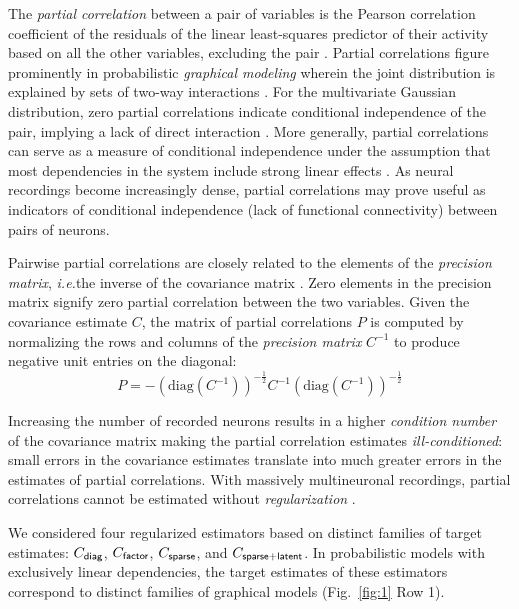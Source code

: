 The \emph{partial correlation} between a pair of variables is the Pearson correlation coefficient of the residuals of the linear least-squares predictor of their activity based on all the other variables, excluding the pair \citep{Anderson:2003, Whittaker:1990}. Partial correlations figure prominently in probabilistic \emph{graphical modeling} wherein the joint distribution is explained by sets of two-way interactions \citep{Whittaker:1990}. For the multivariate Gaussian distribution, zero partial correlations indicate conditional independence of the pair, implying a lack of direct interaction \citep{Dempster:1972, Whittaker:1990}. More generally, partial correlations can serve as a measure of conditional independence under the assumption that most dependencies in the system include strong linear effects \citep{Whittaker:1990,Baba:2004}. As neural recordings become increasingly dense, partial correlations may prove useful as indicators of conditional independence (lack of functional connectivity) between pairs of neurons.

Pairwise partial correlations are closely related to the elements of the \emph{precision matrix}, \emph{i.e.}\;the inverse of the covariance matrix \citep{Dempster:1972,Whittaker:1990}. Zero elements in the precision matrix signify zero partial correlation between the two variables. Given the covariance estimate $C$, the matrix of partial correlations $P$ is computed by normalizing the rows and columns of the \emph{precision matrix} $C^{-1}$ to produce negative unit entries on the diagonal:
\begin{equation}\label{eq:partial}
    P = -\left(\mbox{diag}(C^{-1})\right)^{-\frac 1 2} C^{-1} \left(\mbox{diag}(C^{-1})\right)^{-\frac 1 2}
\end{equation}

Increasing the number of recorded neurons results in a higher \emph{condition number} of the covariance matrix \cite{Ledoit:2004} making the partial correlation estimates \emph{ill-conditioned}: small errors in the covariance estimates translate into much greater errors in the estimates of partial correlations. With massively multineuronal recordings, partial correlations cannot be estimated without \emph{regularization} \cite{Ledoit:2004,Schafer:2005}.

We considered four regularized estimators based on distinct families of target estimates: $C_{\sf diag}$, $C_{\sf factor}$, $C_{\sf sparse}$, and $C_{\sf sparse+latent}$. In probabilistic models with exclusively linear dependencies, the target estimates of these estimators correspond to distinct families of graphical models (Fig.~\ref{fig:1} Row 1).

